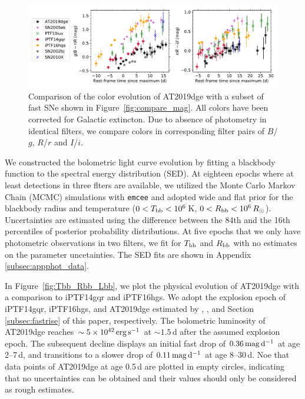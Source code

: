 \documentclass[twocolumn]{aastex63}
\begin{document}
\begin{CJK*}{UTF8}{gbsn}
\begin{figure}[!htbp]
\end{figure}
\begin{figure}[htbp!]
	\centering
	\includegraphics[width=\textwidth]{figures/compare_color.pdf}
	\caption{Comparison of the color evolution of AT2019dge with a subset of fast SNe shown in 
		Figure~\ref{fig:compare_mag}. All colors have been corrected for Galactic extincton. Due to 
		absence of photometry in identical filters, we compare colors in corresponding filter pairs of 
		$B$/$g$, $R$/$r$ and $I$/$i$.  \label{fig:compare_color}}
\end{figure}

We constructed the bolometric light curve evolution by fitting a blackbody function to the spectral 
energy distribution (SED). At eighteen epochs where at least detections in three flters are available, we 
utilized the Monte Carlo Markov Chain (MCMC) simulations with \texttt{emcee} 
\citep{Foreman-Mackey2013} and adopted wide and flat prior for the blackbody radius and 
temperature ($0<T_{\rm bb}<10^6$\,K, $0<R_{\rm bb}<10^6\,R_\odot$). Uncertainties are estimated 
using the difference between the 84th and the 16th percentiles of posterior probability distributions. At 
five epochs that we only have photometric observations in two filters, we fit for $T_{\rm bb}$ and 
$R_{\rm bb}$ with no estimates on the parameter uncetainties. The SED fits are shown in 
Appendix \ref{subsec:appphot_data}. 

In Figure~\ref{fig:Tbb_Rbb_Lbb}, we plot the physical evolution of AT2019dge with a comparison to 
iPTF14gqr and iPTF16hgs. We adopt the explosion epoch of iPTF14gqr, iPTF16hgs, and AT2019dge 
estimated by \citet{De2018}, \citet{DeKC2018}, and Section \ref{subsec:fastrise} of this paper, 
respectively. The bolometric luminosity of AT2019dge reaches $\sim 5\times 10^{42}\,{\rm erg\, s^{-1}}$ 
at $\sim 1.5$\,d after the assumed explosion epoch. The subsequent decline displays an initial 
fast drop of $0.36\,{\rm mag\,d^{-1}}$ at age 2--7\,d, and transitions to a slower drop of $0.11\,{\rm 
mag\,d^{-1}}$ at age 8--30\,d. Noe that data points of AT2019dge at age 0.5\,d are plotted in 
empty circles, indicating that no uncertainties can be obtained and their values should only be 
considered as rough estimates. 


\end{CJK*}
\end{document}
